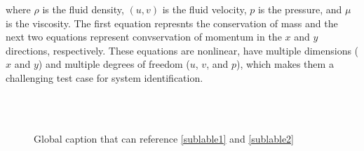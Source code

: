 \documentclass{article}
\begin{document}
where $\rho$ is the fluid density, $(u, v)$ is the fluid velocity, $p$ is the pressure, and $\mu$ is the viscosity. The first equation represnts the conservation of mass and the next two equations represent convservation of momentum in the $x$ and $y$ directions, respectively. These equations are nonlinear, have multiple dimensions ($x$ and $y$) and multiple degrees of freedom ($u$, $v$, and $p$), which makes them a challenging test case for system identification.

\begin{figure}[ht]
  \vskip 0.2in
     \\
     \\
    \caption{Global caption that can reference \ref{sublable1} and \ref{sublable2}}
    \label{ns_data}
    \vskip -0.2in
\end{figure}
\end{document}
